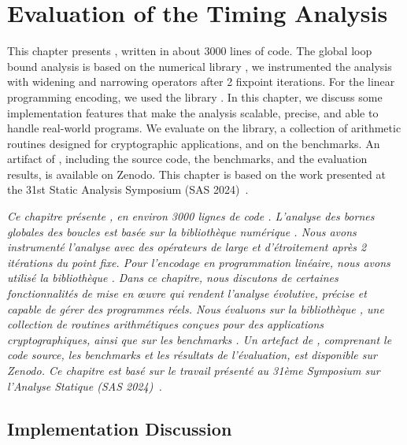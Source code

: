 \setchapterpreamble[u]{\margintoc}

\chapter{Evaluation of the Timing Analysis}

\marginemptybox{2.2cm}

This chapter presents \timesec,\sidenote{\timesecurl} written in about 3000 lines of \python{} code.
The global loop bound analysis is based on the numerical library \apron{} , we instrumented the analysis with widening and narrowing operators after 2 fixpoint iterations.
For the linear programming encoding, we used the \python{} library \scipy.
In this chapter, we discuss some implementation features that make the analysis scalable, precise, and able to handle real-world programs.
We evaluate \timesec{} on the \bignum{} library,\sidenote{\bignumurl} a collection of arithmetic routines designed for cryptographic applications, and on the \svcomp{} benchmarks.\sidenote{\svcompurl}
An artifact of \timesec, including the source code, the benchmarks, and the evaluation results, is available on Zenodo.\sidenote{\timeseczenodo}
This chapter is based on the work presented at the 31st Static Analysis Symposium (SAS 2024)~.


\frenchdiv

\emph{Ce chapitre présente \timesec, en environ 3000 lignes de code \python{}. L'analyse des bornes globales des boucles est basée sur la bibliothèque numérique \apron{} \cite{Jeannet2009}. Nous avons instrumenté l'analyse avec des opérateurs de large et d'étroitement après 2 itérations du point fixe. Pour l'encodage en programmation linéaire, nous avons utilisé la bibliothèque \python{} \scipy. Dans ce chapitre, nous discutons de certaines fonctionnalités de mise en œuvre qui rendent l'analyse évolutive, précise et capable de gérer des programmes réels. Nous évaluons \timesec{} sur la bibliothèque \bignum{}, une collection de routines arithmétiques conçues pour des applications cryptographiques, ainsi que sur les benchmarks \svcomp{}. Un artefact de \timesec, comprenant le code source, les benchmarks et les résultats de l'évaluation, est disponible sur Zenodo. Ce chapitre est basé sur le travail présenté au 31ème Symposium sur l'Analyse Statique (SAS 2024)~\cite{Mazzucato2024c}.}

\section{Implementation Discussion}

